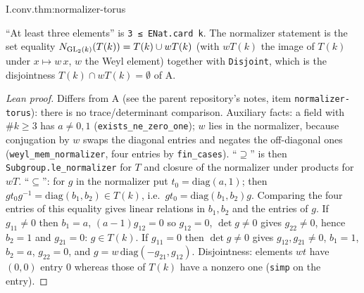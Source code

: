 \begin{theorem}
\end{theorem}
\begin{tfformal}{I.conv.thm:normalizer-torus}
\begin{tffidelity}
``At least three elements'' is \texttt{3 ≤ ENat.card k}. The normalizer statement is the set equality $N_{\mathrm{GL}_2(k)}(T(k))=T(k)\cup wT(k)$ (with $wT(k)$ the image of $T(k)$ under $x\mapsto w\,x$, $w$ the Weyl element) together with \texttt{Disjoint}, which is the disjointness $T(k)\cap wT(k)=\emptyset$ of A.
\end{tffidelity}
\end{tfformal}
\begin{proof}[Lean proof]
Differs from A (see the parent repository's notes, item \texttt{normalizer-torus}): there is no trace/determinant comparison. Auxiliary facts: a field with $\#k\ge3$ has $a\ne0,1$ (\texttt{exists\_ne\_zero\_one}); $w$ lies in the normalizer, because conjugation by $w$ swaps the diagonal entries and negates the off-diagonal ones (\texttt{weyl\_mem\_normalizer}, four entries by \texttt{fin\_cases}). ``$\supseteq$'' is then \texttt{Subgroup.le\_normalizer} for $T$ and closure of the normalizer under products for $wT$. ``$\subseteq$'': for $g$ in the normalizer put $t_0=\mathrm{diag}(a,1)$; then $gt_0g^{-1}=\mathrm{diag}(b_1,b_2)\in T(k)$, i.e.\ $gt_0=\mathrm{diag}(b_1,b_2)g$. Comparing the four entries of this equality gives linear relations in $b_1,b_2$ and the entries of $g$. If $g_{11}\ne0$ then $b_1=a$, $(a-1)g_{12}=0$ so $g_{12}=0$, $\det g\ne0$ gives $g_{22}\ne0$, hence $b_2=1$ and $g_{21}=0$: $g\in T(k)$. If $g_{11}=0$ then $\det g\ne0$ gives $g_{12},g_{21}\ne0$, $b_1=1$, $b_2=a$, $g_{22}=0$, and $g=w\,\mathrm{diag}(-g_{21},g_{12})$. Disjointness: elements $wt$ have $(0,0)$ entry $0$ whereas those of $T(k)$ have a nonzero one (\texttt{simp} on the entry).
\end{proof}


